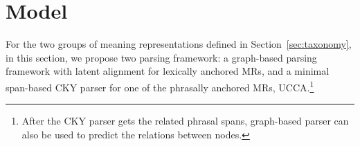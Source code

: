 \section{Model}
For the two groups of meaning representations defined in
Section~\ref{sec:taxonomy}, in this section, we propose two parsing framework:
a graph-based parsing framework with latent alignment for lexically
anchored MRs, and a minimal span-based CKY parser for one of the phrasally anchored
MRs, UCCA.\footnote{After the CKY parser gets the related phrasal
spans, graph-based parser can also be used to predict the relations
between nodes.}












